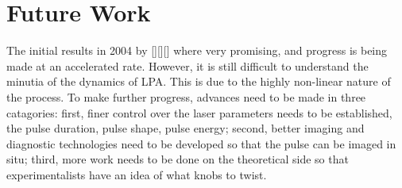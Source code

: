 \documentclass[12pt, titlepage]{caesar_book}
\begin{document}
\section{Future Work}

The initial results in 2004 by [][][] where very promising, and progress is being made at an accelerated rate. However, it is still difficult to understand the minutia of the dynamics of LPA. This is due to the highly non-linear nature of the process. To make further progress, advances need to be made in three catagories: first, finer control over the laser parameters needs to be established, the pulse duration, pulse shape, pulse energy; second, better imaging and
diagnostic technologies need to be developed so that the pulse can be imaged in situ; third, more work needs to be done on the theoretical side so that experimentalists have an idea of what knobs to twist.
\end{document}
